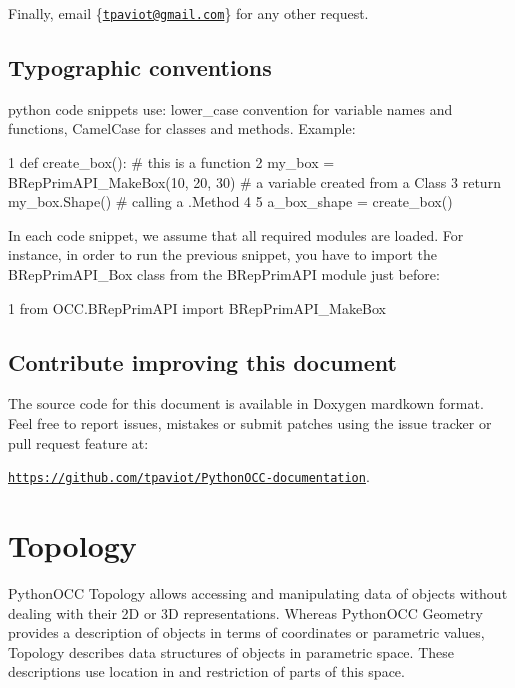 Finally, email \{\href{mailto:tpaviot@gmail.com}{\tt tpaviot@gmail.\+com}\} for any other request.\hypertarget{occt_user_guides__modeling_data_typo}{}\subsection{Typographic conventions}\label{occt_user_guides__modeling_data_typo}
python code snippets use\+: lower\+\_\+case convention for variable names and functions, Camel\+Case for classes and methods. Example\+:


\begin{DoxyCode}
1 def create\_box(): \textcolor{comment}{# this is a function}
2   my\_box = BRepPrimAPI\_MakeBox(10, 20, 30) \textcolor{comment}{# a variable created from a Class}
3   \textcolor{keywordflow}{return} my\_box.Shape() \textcolor{comment}{# calling a .Method}
4 
5 a\_box\_shape = create\_box()
\end{DoxyCode}


In each code snippet, we assume that all required modules are loaded. For instance, in order to run the previous snippet, you have to import the B\+Rep\+Prim\+A\+P\+I\+\_\+\+Box class from the B\+Rep\+Prim\+A\+PI module just before\+:


\begin{DoxyCode}
1 \textcolor{keyword}{from} OCC.BRepPrimAPI \textcolor{keyword}{import} BRepPrimAPI\_MakeBox
\end{DoxyCode}
\hypertarget{occt_user_guides__modeling_data_improve}{}\subsection{Contribute improving this document}\label{occt_user_guides__modeling_data_improve}
The source code for this document is available in Doxygen mardkown format. Feel free to report issues, mistakes or submit patches using the issue tracker or pull request feature at\+:

\href{https://github.com/tpaviot/PythonOCC-documentation}{\tt https\+://github.\+com/tpaviot/\+Python\+O\+C\+C-\/documentation}.\hypertarget{occt_user_guides__modeling_data_occt_modat_5}{}\section{Topology}\label{occt_user_guides__modeling_data_occt_modat_5}
Python\+O\+CC Topology allows accessing and manipulating data of objects without dealing with their 2D or 3D representations. Whereas Python\+O\+CC Geometry provides a description of objects in terms of coordinates or parametric values, Topology describes data structures of objects in parametric space. These descriptions use location in and restriction of parts of this space.

